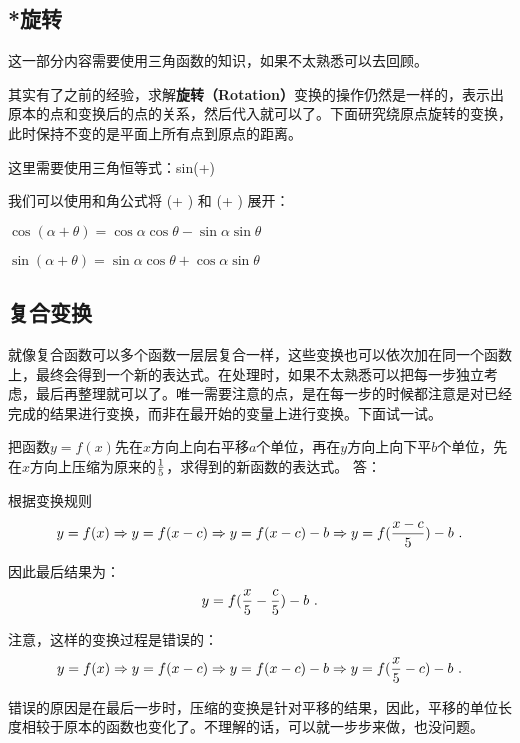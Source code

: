 \subsection{*旋转}

这一部分内容需要使用三角函数的知识，如果不太熟悉可以去回顾。

其实有了之前的经验，求解\textbf{旋转（Rotation）}变换的操作仍然是一样的，表示出原本的点和变换后的点的关系，然后代入就可以了。下面研究绕原点旋转的变换，此时保持不变的是平面上所有点到原点的距离。

这里需要使用三角恒等式：sin(\alpha+)

我们可以使用和角公式将  \cos(\alpha + \theta)  和  \sin(\alpha + \theta)  展开：

$\cos(\alpha + \theta)=\cos \alpha \cos \theta - \sin \alpha \sin \theta$


$\sin(\alpha + \theta)= \sin \alpha \cos \theta + \cos \alpha \sin \theta$






\subsection{复合变换}

就像复合函数可以多个函数一层层复合一样，这些变换也可以依次加在同一个函数上，最终会得到一个新的表达式。在处理时，如果不太熟悉可以把每一步独立考虑，最后再整理就可以了。唯一需要注意的点，是在每一步的时候都注意是对已经完成的结果进行变换，而非在最开始的变量上进行变换。下面试一试。

\begin{exercise}{把函数$y=f(x)$先在$x$方向上向右平移$a$个单位，再在$y$方向上向下平$b$个单位，先在$x$方向上压缩为原来的$1\over5$，求得到的新函数的表达式。}
答：

根据变换规则
$$\displaystyle y=f(x)\Rightarrow y=f(x-c)\Rightarrow y=f(x-c)-b\Rightarrow y=f({{x-c}\over 5})-b~.$$

因此最后结果为：
$$y=f({x\over 5}-{c\over5})-b~.$$

注意，这样的变换过程是错误的：
$$\displaystyle y=f(x)\Rightarrow y=f(x-c)\Rightarrow y=f(x-c)-b\Rightarrow y=f({x\over 5}-c)-b~.$$

错误的原因是在最后一步时，压缩的变换是针对平移的结果，因此，平移的单位长度相较于原本的函数也变化了。不理解的话，可以就一步步来做，也没问题。

\end{exercise}

